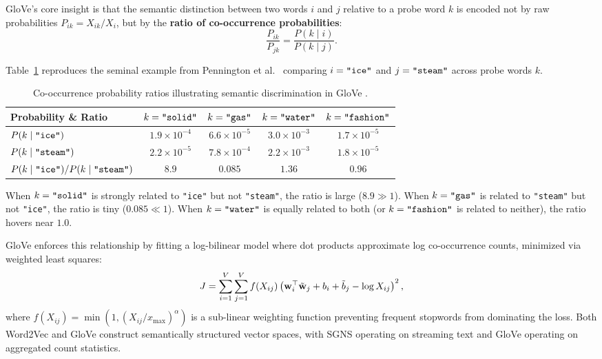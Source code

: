 \documentclass[../../main.tex]{subfiles}
\begin{document}
GloVe's core insight is that the semantic distinction between two words $i$ and $j$ relative to a probe word $k$ is encoded not by raw probabilities $P_{ik} = X_{ik}/X_i$, but by the \textbf{ratio of co-occurrence probabilities}:
\begin{equation}
\label{eq:glove_ratio}
\frac{P_{ik}}{P_{jk}} = \frac{P(k \mid i)}{P(k \mid j)}.
\end{equation}

Table~\ref{tab:glove_ratio} reproduces the seminal example from Pennington et al.~\cite{pennington2014glove} comparing $i = \text{\texttt{"ice"}}$ and $j = \text{\texttt{"steam"}}$ across probe words $k$.

\begin{table}[htbp]
\centering
\small
\caption{Co-occurrence probability ratios illustrating semantic discrimination in GloVe \cite{pennington2014glove}.}
\label{tab:glove_ratio}
\begin{tabular}{lcccc}
\toprule
\textbf{Probability \& Ratio} & $k = \text{\texttt{"solid"}}$ & $k = \text{\texttt{"gas"}}$ & $k = \text{\texttt{"water"}}$ & $k = \text{\texttt{"fashion"}}$ \\
\midrule
$P(k \mid \text{\texttt{"ice"\/}})$ & $1.9 \times 10^{-4}$ & $6.6 \times 10^{-5}$ & $3.0 \times 10^{-3}$ & $1.7 \times 10^{-5}$ \\
$P(k \mid \text{\texttt{"steam"\/}})$ & $2.2 \times 10^{-5}$ & $7.8 \times 10^{-4}$ & $2.2 \times 10^{-3}$ & $1.8 \times 10^{-5}$ \\
\midrule
$P(k \mid \text{\texttt{"ice"\/}}) / P(k \mid \text{\texttt{"steam"\/}})$ & $\mathbf{8.9}$ & $\mathbf{0.085}$ & $1.36$ & $0.96$ \\
\bottomrule
\end{tabular}
\end{table}

When $k = \text{\texttt{"solid"}}$ is strongly related to \texttt{"ice"} but not \texttt{"steam"}, the ratio is large ($8.9 \gg 1$). When $k = \text{\texttt{"gas"}}$ is related to \texttt{"steam"} but not \texttt{"ice"}, the ratio is tiny ($0.085 \ll 1$). When $k = \text{\texttt{"water"}}$ is equally related to both (or $k = \text{\texttt{"fashion"}}$ is related to neither), the ratio hovers near $1.0$.

GloVe enforces this relationship by fitting a log-bilinear model where dot products approximate log co-occurrence counts, minimized via weighted least squares:
\begin{equation}
\label{eq:glove_loss}
J = \sum_{i=1}^V \sum_{j=1}^V f(X_{ij}) \left( \mathbf{w}_i^\top \tilde{\mathbf{w}}_j + b_i + \tilde{b}_j - \log X_{ij} \right)^2,
\end{equation}
where $f(X_{ij}) = \min(1, (X_{ij}/x_{\max})^\alpha)$ is a sub-linear weighting function preventing frequent stopwords from dominating the loss. Both Word2Vec and GloVe construct semantically structured vector spaces, with SGNS operating on streaming text and GloVe operating on aggregated count statistics.
\end{document}
